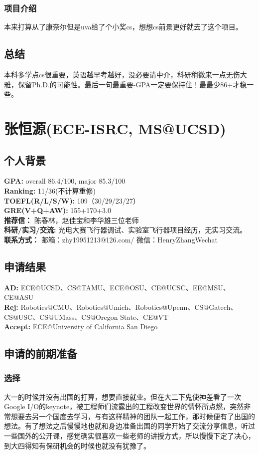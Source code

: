 \documentclass[a4paper,UTF8]{book}
\begin{document}
        \subsubsection*{项目介绍}
        本来打算从了康奈尔但是uva给了个小奖cs，想想cs前景更好就去了这个项目。

    \subsection*{总结}
    本科多学点cs很重要，英语越早考越好，没必要请中介，科研稍微来一点无伤大雅，保留Ph.D.的可能性。最后一句最重要-GPA一定要保持住！最最少86+才稳一些。



\clearpage
\section{张恒源(ECE-ISRC, MS@UCSD)}
    \subsection*{个人背景}
        \textbf{GPA:} overall 86.4/100, major 85.3/100\\
        \textbf{Ranking:} 11/36(不计算重修)\\
        \textbf{TOEFL(R/L/S/W):} 109（30/29/23/27）\\
        \textbf{GRE(V+Q+AW):} 155+170+3.0\\
        \textbf{推荐信：} 陈春林，赵佳宝和李华雄三位老师\\
        \textbf{科研/实习/交流:} 光电大赛飞行器调试、实验室飞行器项目经历，无实习交流。\\ 
        \textbf{联系方式：} 邮箱：zhy19951213@126.com/ 微信：HenryZhangWechat

    \subsection*{申请结果}
        \textbf{AD:} ECE@UCSD、CS@TAMU、ECE@OSU、CE@UCSC、EE@MSU、CE@ASU \\
        \textbf{Rej:} Robotics@CMU、Robotics@Umich、Robotics@Upenn、CS@Gatech、CS@USC、CS@UMass、CS@Oregon State、CE@VT\\
        \textbf{Accept:} ECE@University of California San Diego

    \subsection*{申请的前期准备}
        \subsubsection*{选择}
        大一的时候并没有出国的打算，想要直接就业。但在大二下鬼使神差看了一次Google I/O的keynote，被工程师们流露出的工程改变世界的情怀所点燃，突然非常想要去另一个国度去学习，与有这样精神的团队一起工作，那时候便有了出国的想法。有了想法之后慢慢地也就和身边准备出国的同学开始了交流分享信息，听过一些国外的公开课，感觉确实很喜欢一些老师的讲授方式，所以慢慢下定了决心，到大四得知有保研机会的时候也就没有犹豫了。
\end{document}
